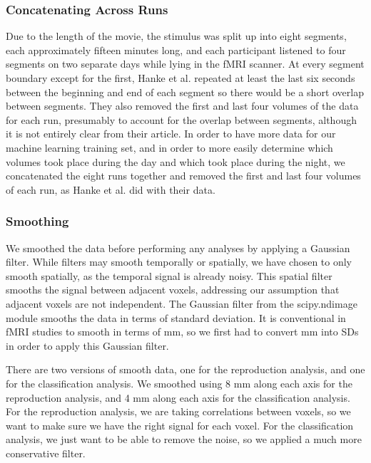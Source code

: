 \documentclass[11pt]{article}
\begin{document}
\subsubsection{Concatenating Across Runs}
Due to the length of the movie, the stimulus was split up into eight segments,  
each approximately fifteen minutes long, and each participant listened to four  
segments on two separate days while lying in the fMRI scanner.  At every        
segment boundary except for the first, Hanke et al. repeated at least the last 
six seconds between the beginning and end of each segment so there would be a 
short overlap between segments.  They also removed the first and last four 
volumes of the data for each run, presumably to account for the overlap 
between segments, although it is not entirely clear from their article.  In 
order to have more data for our machine learning training set, and in order to 
more easily determine which volumes took place during the day and which took 
place during the night, we concatenated the eight runs together and removed the
first and last four volumes of each run, as Hanke et al. did with their data.

\subsubsection{Smoothing}

We smoothed the data before performing any analyses by applying a Gaussian      
filter.  While filters may smooth temporally or spatially, we have chosen to    
only smooth spatially, as the temporal signal is already noisy.  This spatial  
filter smooths the signal between adjacent voxels, addressing                   
our assumption that adjacent voxels are not independent.  The   
Gaussian filter from the scipy.ndimage module smooths the data in terms of      
standard deviation.  It is conventional in fMRI studies to smooth in terms of mm, 
so we first had to convert mm into SDs in order to apply this  
Gaussian filter.

There are two versions of smooth data, one for the reproduction analysis, and
one for the classification analysis.  We smoothed using 8 mm along each axis
for the reproduction analysis, and 4 mm along each axis for the classification
analysis.  For the reproduction analysis, we are taking correlations between
voxels, so we want to make sure we have the right signal for each voxel.  For the classification analysis, we just want to be able to remove the noise, so we 
applied a much more conservative filter.
\end{document}
